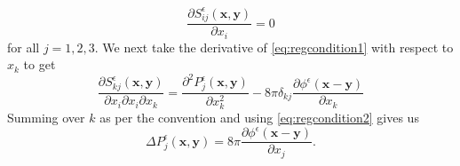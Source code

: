 \begin{equation}
\label{eq:regcondition2}
    \frac{\partial S^\epsilon_{ij}(\bm{x},\bm{y})}{\partial x_i} = 0
\end{equation}
for all $j=1,2,3$. We next take the derivative of \cref{eq:regcondition1} with respect to $x_k$ to get
\begin{equation*}
    \frac{\partial S^\epsilon_{kj}(\bm{x},\bm{y})}{\partial x_i \partial x_i \partial x_k} = \frac{\partial^2 P^\epsilon_{j}(\bm{x},\bm{y})}{\partial x_k^2} - 8\pi\delta_{kj}\frac{\partial \phi^\epsilon(\bm{x}-\bm{y})}{\partial x_k}
\end{equation*}
Summing over $k$ as per the convention and using \cref{eq:regcondition2} gives us
\begin{equation}
\label{eq:regpressureeq}
    \Delta P^\epsilon_{j}(\bm{x},\bm{y}) = 8\pi\frac{\partial \phi^\epsilon(\bm{x}-\bm{y})}{\partial x_j}.
\end{equation}

